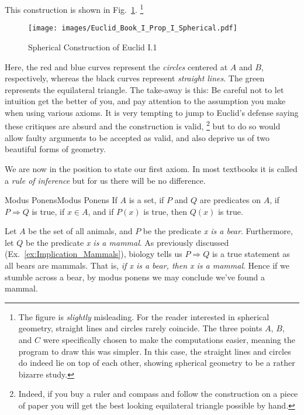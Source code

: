         This construction is shown in Fig.~\ref{fig:Euclid_Spherical_I_I}.
        \footnote{%
            The figure is \textit{slightly} misleading. For the reader
            interested in spherical geometry, straight lines and circles rarely
            coincide. The three points $A$, $B$, and $C$ were specifically
            chosen to make the computations easier, meaning the program to draw
            this was simpler. In this case, the straight lines and circles do
            indeed lie on top of each other, showing spherical geometry to be a
            rather bizarre study.
        }
        \begin{figure}[H]
            \centering
            \captionsetup{type=figure}
            \texttt{[image: images/Euclid\_Book\_I\_Prop\_I\_Spherical.pdf]}
            \caption{Spherical Construction of Euclid I.1}
            \label{fig:Euclid_Spherical_I_I}
        \end{figure}
        Here, the red and blue curves represent the \textit{circles} centered at
        $A$ and $B$, respectively, whereas the black curves represent
        \textit{straight lines}. The green represents the equilateral triangle.
        The take-away is this: Be careful not to let intuition get the better of
        you, and pay attention to the assumption you make when using various
        axioms. It is very tempting to jump to Euclid's defense saying these
        critiques are absurd and the construction is valid,%
        \footnote{%
            Indeed, if you buy a ruler and compass and follow the construction
            on a piece of paper you will get the best looking equilateral
            triangle possible by hand.
        }
        but to do so would allow faulty arguments to be accepted as valid, and
        also deprive us of two beautiful forms of geometry.
        \par\hfill\par
        We are now in the position to state our first axiom. In most textbooks
        it is called a \textit{rule of inference} but for us there will be no
        difference.
        \begin{faxiom}{Modus Ponens}{Modus Ponens}
            If $A$ is a set, if $P$ and $Q$ are predicates on $A$, if
            $P\Rightarrow{Q}$ is true, if $x\in{A}$, and if $P(x)$ is
            true, then $Q(x)$ is true.
        \end{faxiom}
        \begin{example}
            Let $A$ be the set of all animals, and $P$ be the predicate
            \textit{x is a bear}. Furthermore, let $Q$ be the predicate
            \textit{x is a mammal}. As previously discussed
            (Ex.~\ref{ex:Implication_Mammals}), biology tells us
            $P\Rightarrow{Q}$ is a true statement as all bears are mammals. That
            is, \textit{if x is a bear, then x is a mammal}. Hence if we stumble
            across a bear, by modus ponens we may conclude we've found a mammal.
        \end{example}
